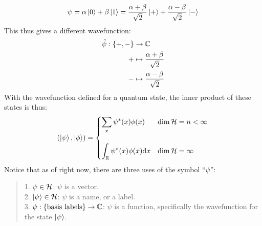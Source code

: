 $$\psi = \alpha \ket{0} + \beta \ket{1} = \frac{\alpha + \beta}{\sqrt{2}}\ket{+} + \frac{\alpha - \beta}{\sqrt{2}}\ket{-}$$
This thus gives a different wavefunction:
\begin{align*}
    \tilde{\psi}: \{+, -\} &\to \mathbb{C} \\
    + &\mapsto \frac{\alpha + \beta}{\sqrt{2}} \\
    - &\mapsto \frac{\alpha - \beta}{\sqrt{2}}
\end{align*}
With the wavefunction defined for a quantum state, the inner product of these states is thus:
$$(\ket{\psi}, \ket{\phi}) = \begin{cases}
    \displaystyle \sum_{x} \psi^{*}(x)\phi(x) & \dim \mathcal{H} = n < \infty \\
    & \\
    \displaystyle \int_{\mathbb{R}} \psi^{*}(x)\phi(x) \dd x & \dim \mathcal{H} = \infty
\end{cases}$$
Notice that as of right now, there are three uses of the symbol ``$\psi$'':
\begin{quote}
    1. $\psi \in \mathcal{H}$: $\psi$ is a vector. \\
    2. $\ket{\psi} \in \mathcal{H}$: $\psi$ is a name, or a label. \\
    3. $\psi: \{\text{basis labels}\} \to \mathbb{C}$: $\psi$ is a function, specifically the wavefunction for the state $\ket{\psi}$.
\end{quote}
